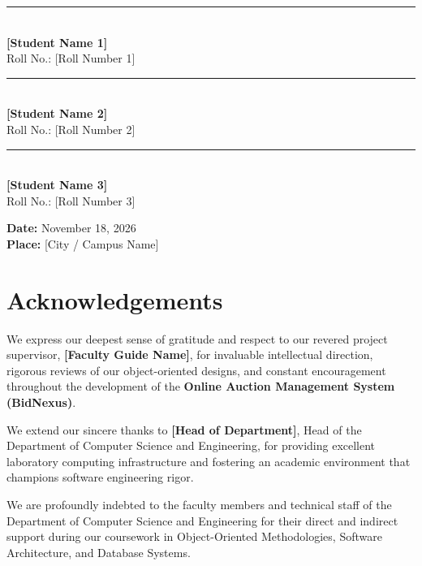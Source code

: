 \documentclass[12pt,a4paper]{article}
\begin{document}
\vspace{2.5cm}

\noindent
\begin{minipage}[t]{0.32\textwidth}
\centering
\rule{4cm}{0.4pt}\\
\textbf{[Student Name 1]}\\
Roll No.: [Roll Number 1]
\end{minipage}
\hfill
\begin{minipage}[t]{0.32\textwidth}
\centering
\rule{4cm}{0.4pt}\\
\textbf{[Student Name 2]}\\
Roll No.: [Roll Number 2]
\end{minipage}
\hfill
\begin{minipage}[t]{0.32\textwidth}
\centering
\rule{4cm}{0.4pt}\\
\textbf{[Student Name 3]}\\
Roll No.: [Roll Number 3]
\end{minipage}

\vspace{1.5cm}
\noindent \textbf{Date:} November 18, 2026\\
\textbf{Place:} [City / Campus Name]

\newpage

\section*{Acknowledgements}
\vspace{0.8cm}

We express our deepest sense of gratitude and respect to our revered project supervisor, \textbf{[Faculty Guide Name]}, for invaluable intellectual direction, rigorous reviews of our object-oriented designs, and constant encouragement throughout the development of the \textbf{Online Auction Management System (BidNexus)}.

We extend our sincere thanks to \textbf{[Head of Department]}, Head of the Department of Computer Science and Engineering, for providing excellent laboratory computing infrastructure and fostering an academic environment that champions software engineering rigor.

We are profoundly indebted to the faculty members and technical staff of the Department of Computer Science and Engineering for their direct and indirect support during our coursework in Object-Oriented Methodologies, Software Architecture, and Database Systems.
\end{document}
